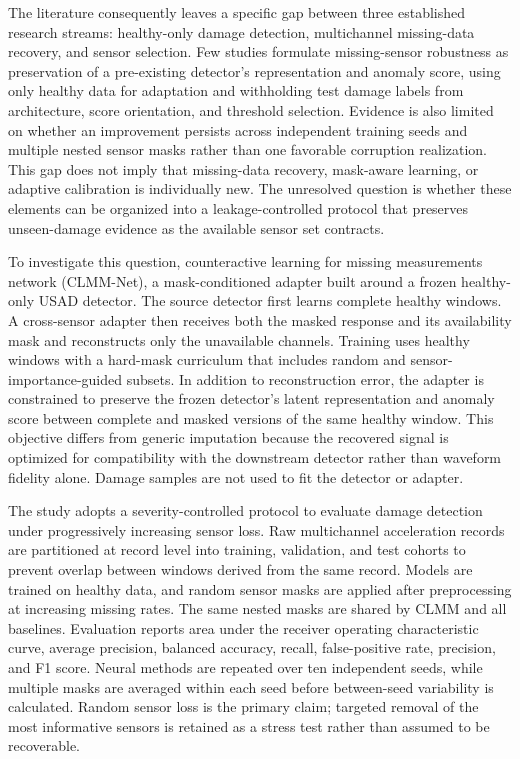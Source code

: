 \documentclass[a4paper,fleqn]{cas-sc}
\begin{document}
The literature consequently leaves a specific gap between three established research streams: healthy-only damage detection, multichannel missing-data recovery, and sensor selection. Few studies formulate missing-sensor robustness as preservation of a pre-existing detector's representation and anomaly score, using only healthy data for adaptation and withholding test damage labels from architecture, score orientation, and threshold selection. Evidence is also limited on whether an improvement persists across independent training seeds and multiple nested sensor masks rather than one favorable corruption realization. This gap does not imply that missing-data recovery, mask-aware learning, or adaptive calibration is individually new. The unresolved question is whether these elements can be organized into a leakage-controlled protocol that preserves unseen-damage evidence as the available sensor set contracts.

To investigate this question, counteractive learning for missing measurements network (CLMM-Net), a mask-conditioned adapter built around a frozen healthy-only USAD detector. The source detector first learns complete healthy windows. A cross-sensor adapter then receives both the masked response and its availability mask and reconstructs only the unavailable channels. Training uses healthy windows with a hard-mask curriculum that includes random and sensor-importance-guided subsets. In addition to reconstruction error, the adapter is constrained to preserve the frozen detector's latent representation and anomaly score between complete and masked versions of the same healthy window. This objective differs from generic imputation because the recovered signal is optimized for compatibility with the downstream detector rather than waveform fidelity alone. Damage samples are not used to fit the detector or adapter.

The study adopts a severity-controlled protocol to evaluate damage detection under progressively increasing sensor loss. Raw multichannel acceleration records are partitioned at record level into training, validation, and test cohorts to prevent overlap between windows derived from the same record. Models are trained on healthy data, and random sensor masks are applied after preprocessing at increasing missing rates. The same nested masks are shared by CLMM and all baselines. Evaluation reports area under the receiver operating characteristic curve, average precision, balanced accuracy, recall, false-positive rate, precision, and F1 score. Neural methods are repeated over ten independent seeds, while multiple masks are averaged within each seed before between-seed variability is calculated. Random sensor loss is the primary claim; targeted removal of the most informative sensors is retained as a stress test rather than assumed to be recoverable.
\end{document}
